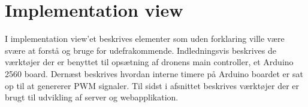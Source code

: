 \section{Implementation view}

I implementation view'et beskrives elementer som uden forklaring ville være svære at forstå og bruge for udefrakommende. Indledningsvis beskrives de værktøjer der er benyttet til opsætning af dronens main controller, et Arduino 2560 board. Dernæst beskrives hvordan interne timere på Arduino boardet er sat op til at genererer PWM signaler. Til sidst i afsnittet beskrives værktøjer der er brugt til udvikling af server og webapplikation.  



\newpage


\newpage


\newpage
